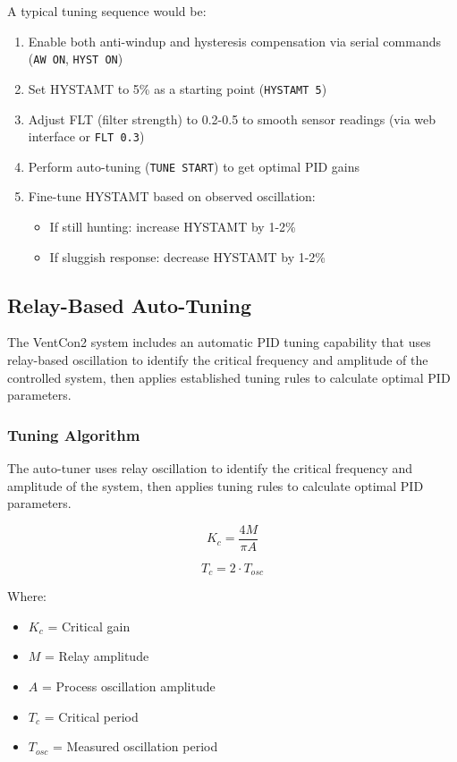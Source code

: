A typical tuning sequence would be:

\begin{enumerate}
    \item Enable both anti-windup and hysteresis compensation via serial commands (\texttt{AW ON}, \texttt{HYST ON})
    \item Set HYSTAMT to 5\% as a starting point (\texttt{HYSTAMT 5})
    \item Adjust FLT (filter strength) to 0.2-0.5 to smooth sensor readings (via web interface or \texttt{FLT 0.3})
    \item Perform auto-tuning (\texttt{TUNE START}) to get optimal PID gains
    \item Fine-tune HYSTAMT based on observed oscillation:
    \begin{itemize}
        \item If still hunting: increase HYSTAMT by 1-2\%
        \item If sluggish response: decrease HYSTAMT by 1-2\%
    \end{itemize}
\end{enumerate}

\subsection{Relay-Based Auto-Tuning}
\label{sec:auto-tuning}

The VentCon2 system includes an automatic PID tuning capability that uses relay-based oscillation to identify the critical frequency and amplitude of the controlled system, then applies established tuning rules to calculate optimal PID parameters.

\subsubsection{Tuning Algorithm}
The auto-tuner uses relay oscillation to identify the critical frequency and amplitude of the system, then applies tuning rules to calculate optimal PID parameters.

\begin{equation}
K_c = \frac{4M}{\pi A}
\end{equation}

\begin{equation}
T_c = 2 \cdot T_{osc}
\end{equation}

Where:
\begin{itemize}
    \item $K_c$ = Critical gain
    \item $M$ = Relay amplitude  
    \item $A$ = Process oscillation amplitude
    \item $T_c$ = Critical period
    \item $T_{osc}$ = Measured oscillation period
\end{itemize}

